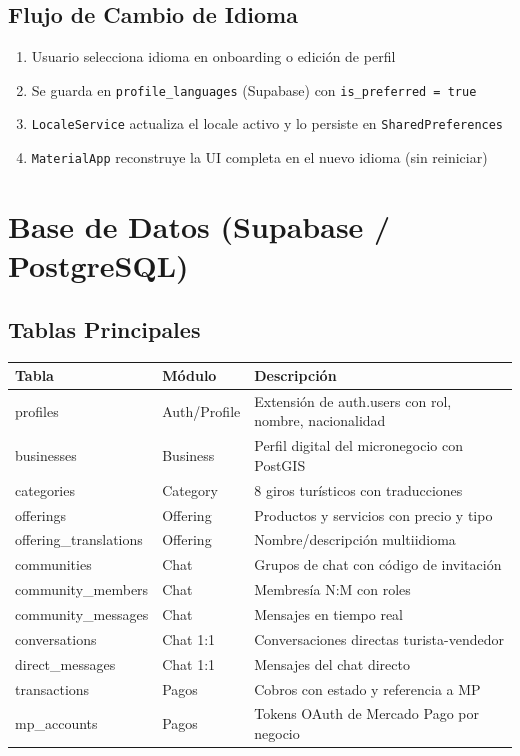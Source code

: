 \documentclass[12pt,a4paper]{article}
\begin{document}
\subsection{Flujo de Cambio de Idioma}

\begin{enumerate}
    \item Usuario selecciona idioma en onboarding o edici\'on de perfil
    \item Se guarda en \texttt{profile\_languages} (Supabase) con \texttt{is\_preferred = true}
    \item \texttt{LocaleService} actualiza el locale activo y lo persiste en \texttt{SharedPreferences}
    \item \texttt{MaterialApp} reconstruye la UI completa en el nuevo idioma (sin reiniciar)
\end{enumerate}

\section{Base de Datos (Supabase / PostgreSQL)}

\subsection{Tablas Principales}

\begin{tabularx}{\textwidth}{llX}
\toprule
\textbf{Tabla} & \textbf{M\'odulo} & \textbf{Descripci\'on} \\
\midrule
profiles & Auth/Profile & Extensi\'on de auth.users con rol, nombre, nacionalidad \\
businesses & Business & Perfil digital del micronegocio con PostGIS \\
categories & Category & 8 giros tur\'isticos con traducciones \\
offerings & Offering & Productos y servicios con precio y tipo \\
offering\_translations & Offering & Nombre/descripci\'on multiidioma \\
communities & Chat & Grupos de chat con c\'odigo de invitaci\'on \\
community\_members & Chat & Membres\'ia N:M con roles \\
community\_messages & Chat & Mensajes en tiempo real \\
conversations & Chat 1:1 & Conversaciones directas turista-vendedor \\
direct\_messages & Chat 1:1 & Mensajes del chat directo \\
transactions & Pagos & Cobros con estado y referencia a MP \\
mp\_accounts & Pagos & Tokens OAuth de Mercado Pago por negocio \\
\bottomrule
\end{tabularx}
\end{document}
